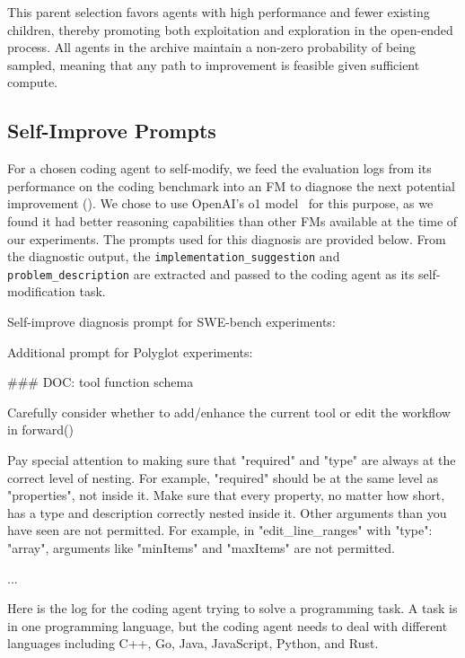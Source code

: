 \documentclass{article}
\begin{document}
This parent selection favors agents with high performance and fewer existing children, thereby promoting both exploitation and exploration in the open-ended process. All agents in the archive maintain a non-zero probability of being sampled, meaning that any path to improvement is feasible given sufficient compute.

\subsection{Self-Improve Prompts}
\label{app:selfimprove-prompts}

For a chosen coding agent to self-modify, we feed the evaluation logs from its performance on the coding benchmark into an FM to diagnose the next potential improvement (). We chose to use OpenAI's o1 model~\citep{openai2024o1} for this purpose, as we found it had better reasoning capabilities than other FMs available at the time of our experiments. The prompts used for this diagnosis are provided below. From the diagnostic output, the \texttt{implementation\_suggestion} and \texttt{problem\_description} are extracted and passed to the coding agent as its self-modification task.

Self-improve diagnosis prompt for SWE-bench experiments:


Additional prompt for Polyglot experiments:

\begin{tcolorbox}[breakable,colback=orange!5!white, colframe=orange!80!black, title=Additional Prompt for o3-mini Tool Use and Polyglot]
\scriptsize
\begin{MyVerbatim}
### DOC: tool function schema

Carefully consider whether to add/enhance the current tool or edit the workflow in forward()

Pay special attention to making sure that "required" and "type" are always at the correct level of nesting. For example, "required" should be at the same level as "properties", not inside it.
Make sure that every property, no matter how short, has a type and description correctly nested inside it.
Other arguments than you have seen are not permitted. For example, in "edit_line_ranges" with "type": "array", arguments like "minItems" and "maxItems" are not permitted.

...

Here is the log for the coding agent trying to solve a programming task. 
A task is in one programming language, but the coding agent needs to deal with different languages including C++, Go, Java, JavaScript, Python, and Rust.
\end{MyVerbatim}
\end{tcolorbox}
\end{document}
